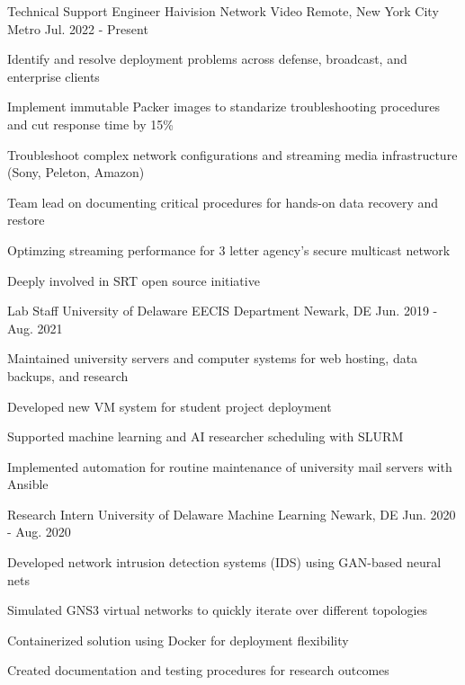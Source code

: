 \documentclass[11pt, letterpaper]{awesome-cv}
\begin{document}
\begin{cventries}

  \cventry
    {Technical Support Engineer} %
    {Haivision Network Video} %
    {Remote, New York City Metro} %
    {Jul. 2022 - Present} %
    {
      \begin{cvitems} %
        \item {Identify and resolve deployment problems across defense, broadcast, and enterprise clients}
        \item {Implement immutable Packer images to standarize troubleshooting procedures and cut response time by 15\%}
        \item {Troubleshoot complex network configurations and streaming media infrastructure (Sony, Peleton, Amazon)}
        \item {Team lead on documenting critical procedures for hands-on data recovery and restore}
        \item {Optimzing streaming performance for 3 letter agency's secure multicast network}
        \item {Deeply involved in SRT open source initiative}
      \end{cvitems}
    }

\vspace{0.5cm}
  \cventry
    {Lab Staff}
    {University of Delaware EECIS Department}
    {Newark, DE}
    {Jun. 2019 - Aug. 2021}
    {
      \begin{cvitems}
        \item {Maintained university servers and computer systems for web hosting, data backups, and research}
        \item {Developed new VM system for student project deployment}
        \item {Supported machine learning and AI researcher scheduling with SLURM}
        \item {Implemented automation for routine maintenance of university mail servers with Ansible}
      \end{cvitems}
    }

\vspace{0.5cm}
  \cventry
    {Research Intern}
    {University of Delaware Machine Learning}
    {Newark, DE}
    {Jun. 2020 - Aug. 2020}
    {
      \begin{cvitems}
        \item {Developed network intrusion detection systems (IDS) using GAN-based neural nets}
        \item {Simulated GNS3 virtual networks to quickly iterate over different topologies}
        \item {Containerized solution using Docker for deployment flexibility}
        \item {Created documentation and testing procedures for research outcomes}
      \end{cvitems}
    }


\end{cventries}
\end{document}
